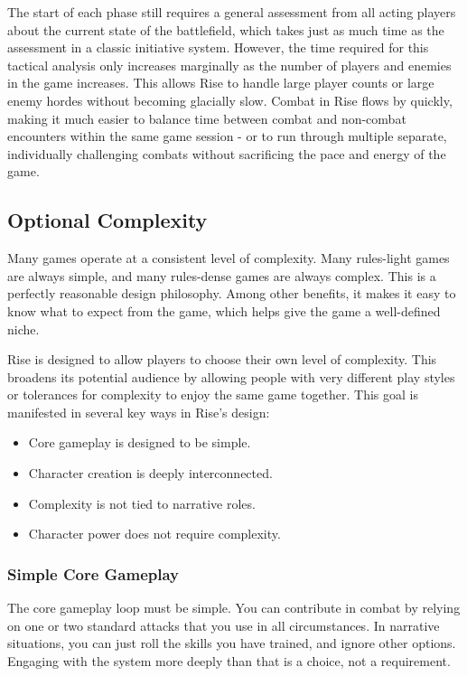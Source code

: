     The start of each phase still requires a general assessment from all acting players about the current state of the battlefield, which takes just as much time as the assessment in a classic initiative system.
    However, the time required for this tactical analysis only increases marginally as the number of players and enemies in the game increases.
    This allows Rise to handle large player counts or large enemy hordes without becoming glacially slow.
    Combat in Rise flows by quickly, making it much easier to balance time between combat and non-combat encounters within the same game session - or to run through multiple separate, individually challenging combats without sacrificing the pace and energy of the game.

  \subsection{Optional Complexity}
    Many games operate at a consistent level of complexity.
    Many rules-light games are always simple, and many rules-dense games are always complex.
    This is a perfectly reasonable design philosophy.
    Among other benefits, it makes it easy to know what to expect from the game, which helps give the game a well-defined niche.

    Rise is designed to allow players to choose their own level of complexity.
    This broadens its potential audience by allowing people with very different play styles or tolerances for complexity to enjoy the same game together.
    This goal is manifested in several key ways in Rise's design:
    \begin{itemize}
      \item Core gameplay is designed to be simple.
      \item Character creation is deeply interconnected.
      \item Complexity is not tied to narrative roles.
      \item Character power does not require complexity.
    \end{itemize}

    \subsubsection{Simple Core Gameplay}
      The core gameplay loop must be simple.
      You can contribute in combat by relying on one or two standard attacks that you use in all circumstances.
      In narrative situations, you can just roll the skills you have trained, and ignore other options.
      Engaging with the system more deeply than that is a choice, not a requirement.


